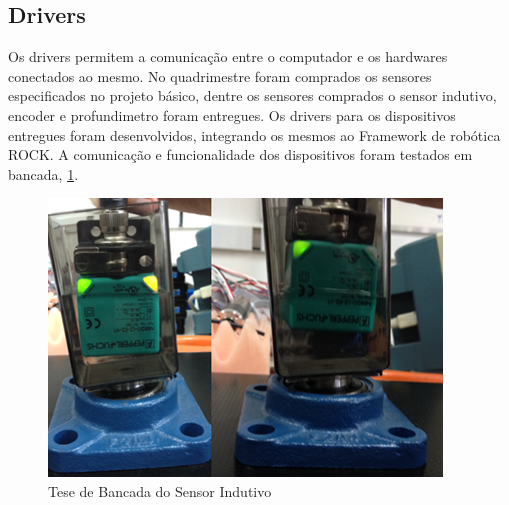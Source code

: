 \noindent
\subsection{Drivers}
Os drivers permitem a comunicação entre o computador e os hardwares conectados ao mesmo. 
No quadrimestre foram comprados os sensores especificados no projeto básico, dentre os sensores comprados o sensor indutivo, encoder e profundimetro foram entregues. 
Os drivers para os dispositivos entregues foram desenvolvidos, integrando os mesmos ao Framework de robótica ROCK. 
A comunicação e funcionalidade dos dispositivos foram testados em bancada, \ref{fig:teste_bancada}. 

\begin{figure}[ht!]
    \centering \includegraphics[width=1\columnwidth]{figs/resultados/teste_bancada}
    \caption{Tese de Bancada do Sensor Indutivo}
    \label{fig:teste_bancada}
\end{figure}


  